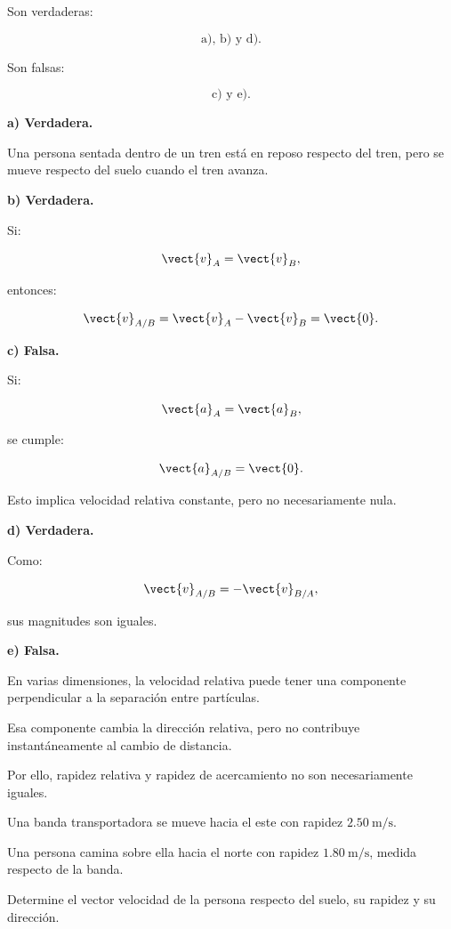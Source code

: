 \begin{respuesta}
Son verdaderas:

\[
\boxed{\text{a), b) y d)}}.
\]

Son falsas:

\[
\boxed{\text{c) y e)}}.
\]
\end{respuesta}

\begin{explicacion}
\textbf{a) Verdadera.}

Una persona sentada dentro de un tren está
en reposo respecto del tren, pero se mueve
respecto del suelo cuando el tren avanza.

\textbf{b) Verdadera.}

Si:

\[
\vect{v}_A=\vect{v}_B,
\]

entonces:

\[
\vect{v}_{A/B}
=
\vect{v}_A-\vect{v}_B
=
\vect{0}.
\]

\textbf{c) Falsa.}

Si:

\[
\vect{a}_A=\vect{a}_B,
\]

se cumple:

\[
\vect{a}_{A/B}=\vect{0}.
\]

Esto implica velocidad relativa constante,
pero no necesariamente nula.

\textbf{d) Verdadera.}

Como:

\[
\vect{v}_{A/B}
=
-\vect{v}_{B/A},
\]

sus magnitudes son iguales.

\textbf{e) Falsa.}

En varias dimensiones, la velocidad relativa
puede tener una componente perpendicular
a la separación entre partículas.

Esa componente cambia la dirección relativa,
pero no contribuye instantáneamente al cambio
de distancia.

Por ello, rapidez relativa y rapidez de
acercamiento no son necesariamente iguales.
\end{explicacion}


\nivelintermedio

\begin{ejercicio}
Una banda transportadora se mueve hacia el este
con rapidez \(\SI{2.50}{\meter\per\second}\).

Una persona camina sobre ella hacia el norte
con rapidez \(\SI{1.80}{\meter\per\second}\),
medida respecto de la banda.

Determine el vector velocidad de la persona
respecto del suelo, su rapidez y su dirección.
\end{ejercicio}

